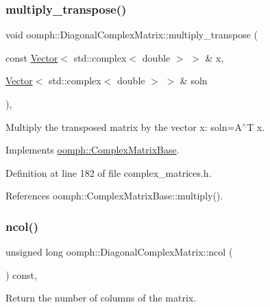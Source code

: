 \subsubsection{\texorpdfstring{multiply\+\_\+transpose()}{multiply\_transpose()}}
{\footnotesize\ttfamily void oomph\+::\+Diagonal\+Complex\+Matrix\+::multiply\+\_\+transpose (\begin{DoxyParamCaption}\item[{const \hyperlink{classoomph_1_1Vector}{Vector}$<$ std\+::complex$<$ double $>$ $>$ \&}]{x,  }\item[{\hyperlink{classoomph_1_1Vector}{Vector}$<$ std\+::complex$<$ double $>$ $>$ \&}]{soln }\end{DoxyParamCaption})\hspace{0.3cm}{\ttfamily [inline]}, {\ttfamily [virtual]}}



Multiply the transposed matrix by the vector x\+: soln=A$^\wedge$T x. 



Implements \hyperlink{classoomph_1_1ComplexMatrixBase_a90c7832bad84aad3d0f437925efb089a}{oomph\+::\+Complex\+Matrix\+Base}.



Definition at line 182 of file complex\+\_\+matrices.\+h.



References oomph\+::\+Complex\+Matrix\+Base\+::multiply().

\mbox{\label{classoomph_1_1DiagonalComplexMatrix_ab56dee3ac2b928655382ad6697edd318}} 
\subsubsection{\texorpdfstring{ncol()}{ncol()}}
{\footnotesize\ttfamily unsigned long oomph\+::\+Diagonal\+Complex\+Matrix\+::ncol (\begin{DoxyParamCaption}{ }\end{DoxyParamCaption}) const\hspace{0.3cm}{\ttfamily [inline]}, {\ttfamily [virtual]}}



Return the number of columns of the matrix. 



